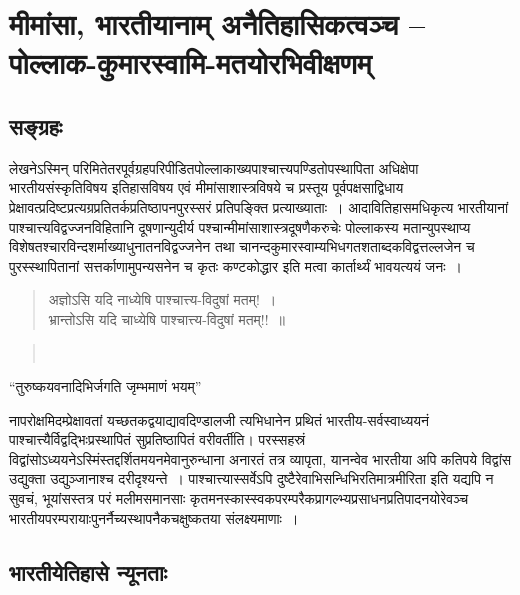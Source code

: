 
\chapter{मीमांसा, भारतीयानाम् अनैतिहासिकत्वञ्च – पोल्लाक-कुमारस्वामि-मतयोरभिवीक्षणम्}\label{chapter4}



\section*{सङ्ग्रहः}

लेखनेऽस्मिन् परिमितेतरपूर्वग्रहपरिपीडितपोल्लाकाख्यपाश्चात्त्यपण्डितोपस्थापिता अधिक्षेपा भारतीयसंस्कृतिविषय इतिहासविषय एवं मीमांसाशास्त्रविषये च प्रस्तूय पूर्वपक्षसाद्विधाय प्रेक्षावत्प्रदिष्टप्रत्यग्रप्रतितर्कप्रतिष्ठापनपुरस्सरं प्रतिपङ्क्ति प्रत्याख्याताः~। आदावितिहासमधिकृत्य भारतीयानां पाश्चात्त्यविद्वज्जनविहितानि दूषणान्युदीर्य पश्चान्मीमांसाशास्त्रदूषणैकरुचेः पोल्लाकस्य मतान्युपस्थाप्य विशेषतश्चारविन्दशर्माख्याधुनातनविद्वज्जनेन तथा चानन्दकुमारस्वाम्यभिधगतशताब्दकविद्वत्तल्लजेन च पुरस्स्थापितानां सत्तर्काणामुपन्यसनेन च कृतः कण्टकोद्धार इति मत्वा कार्तार्थ्यं भावयत्ययं जनः~।

\begin{verse}
अज्ञोऽसि यदि नाध्येषि पाश्चात्त्य-विदुषां मतम्!~।\\ भ्रान्तोऽसि यदि चाध्येषि पाश्चात्त्य-विदुषां मतम्!!~॥
\end{verse}

\begin{verse}
\\
\end{verse}

“तुरुष्कयवनादिभिर्जगति जृम्भमाणं भयम्”

नापरोक्षमिदम्प्रेक्षावतां यच्छतकद्वयाद्यावदिण्डालजी त्यभिधानेन प्रथितं भारतीय-सर्वस्वाध्ययनं पाश्चात्त्यैर्विद्वद्भिःप्रस्थापितं सुप्रतिष्ठापितं वरीवर्तीति। परस्सहस्रं विद्वांसोऽध्ययनेऽस्मिंस्तद्दर्शितमयनमेवानुरुन्धाना अनारतं तत्र व्यापृता, यानन्वेव भारतीया अपि कतिपये विद्वांस उद्युक्ता उद्युञ्जानाश्च दरीदृश्यन्ते~। पाश्चात्त्यास्सर्वेऽपि दुष्टैरेवाभिसन्धिभिरतिमात्रमीरिता इति यद्यपि न सुवचं, भूयांसस्तत्र परं मलीमसमानसाः कृतमनस्कास्स्वकपरम्परैकप्रागल्भ्यप्रसाधनप्रतिपादनयोरेवञ्च भारतीयपरम्परायाःपुनर्नैच्यस्थापनैकचक्षुष्कतया संलक्ष्यमाणाः~।


\section*{भारतीयेतिहासे न्यूनताः}

